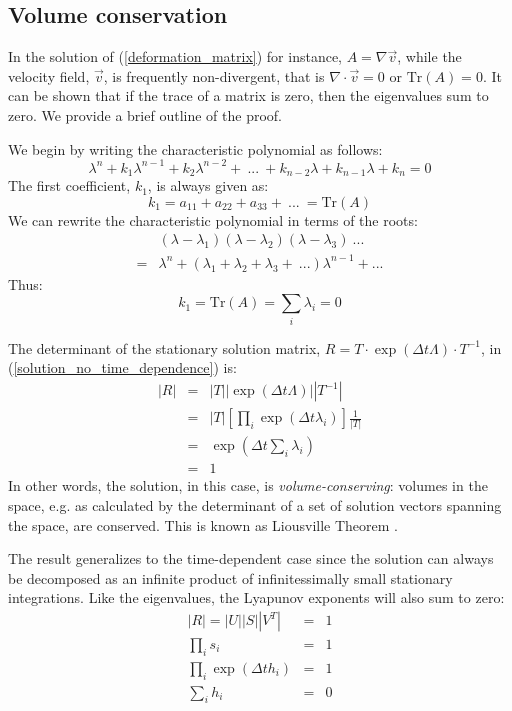 \documentclass[11pt]{article}
\begin{document}
\subsection{Volume conservation}

In the solution of (\ref{deformation_matrix}) for instance, 
$A=\nabla \vec v$, while the velocity field, $\vec v$, is frequently non-divergent,
that is $\nabla \cdot \vec v=0$ or $\mathrm{Tr}(A)=0$.
It can be shown that 
if the trace of a matrix is zero, then the eigenvalues sum to zero.
We provide a brief outline of the proof.

We begin by writing the characteristic polynomial as follows:
\begin{equation}
  \lambda^n + k_1 \lambda^{n-1} + k_2 \lambda^{n-2} + ~... ~
  + k_{n-2} \lambda + k_{n-1} \lambda + k_n = 0
\end{equation}
The first coefficient, $k_1$, is always given as:
\begin{equation}
	k_1 = a_{11} + a_{22} + a_{33} + ~ ... ~ = \mathrm{Tr}(A)
\end{equation}
We can rewrite the characteristic polynomial
in terms of the roots:
\begin{eqnarray}
	& (\lambda - \lambda_1)(\lambda - \lambda_2)(\lambda-\lambda_3) ~ ... \\
	= & \lambda^n + (\lambda_1 + \lambda_2 + \lambda_3 + ~ ...) \lambda^{n-1} + ...
\end{eqnarray}
Thus:
\begin{equation}
	k_1 = \mathrm{Tr}(A) = \sum_i \lambda_i = 0
\end{equation}

The determinant of the stationary solution matrix,
$R=T\cdot\exp(\Delta t\Lambda)\cdot T^{-1}$, in (\ref{solution_no_time_dependence}) is:
\begin{eqnarray}
	|R| & = & |T||\exp(\Delta t\Lambda)||T^{-1}| \\
	    & = & |T| \left [ \prod_i \exp(\Delta t \lambda_i) \right ] \frac{1}{|T|} \\
& = & \exp\left(\Delta t \sum_i \lambda_i\right) \\
& = & 1
\end{eqnarray}
In other words, the solution, in this case, is {\it volume-conserving}:
volumes in the space, e.g. as calculated by the determinant of a set of 
solution vectors
spanning the space, are conserved.  
This is known as Liousville Theorem \citep{Thornton2003}.

The result generalizes to the time-dependent case since the solution can
always be decomposed as an infinite product of infinitessimally small 
stationary integrations.
Like the eigenvalues, the Lyapunov exponents will also sum to zero:
\begin{eqnarray}
|R| =	|U||S||V^T| & = & 1 \\
	\prod_i s_i & = & 1 \\
	\prod_i \exp(\Delta t h_i) & = & 1 \\
	\sum_i h_i & = & 0
\end{eqnarray}
\end{document}
